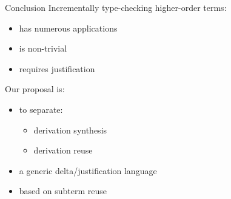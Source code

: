 \documentclass{beamer}
\theoremstyle{example}
\begin{document}
\begin{frame}{Conclusion}
  Incrementally type-checking higher-order terms:
  \begin{itemize}
  \item has numerous applications
  \item is non-trivial
  \item requires justification
  \end{itemize}
  \vspace{1em}

  Our proposal is:
  \begin{itemize}
  \item to separate:
    \begin{itemize}
    \item derivation synthesis
    \item derivation reuse
    \end{itemize}
  \item a generic delta/justification language
  \item based on subterm reuse
  \end{itemize}
\end{frame}
\end{document}
